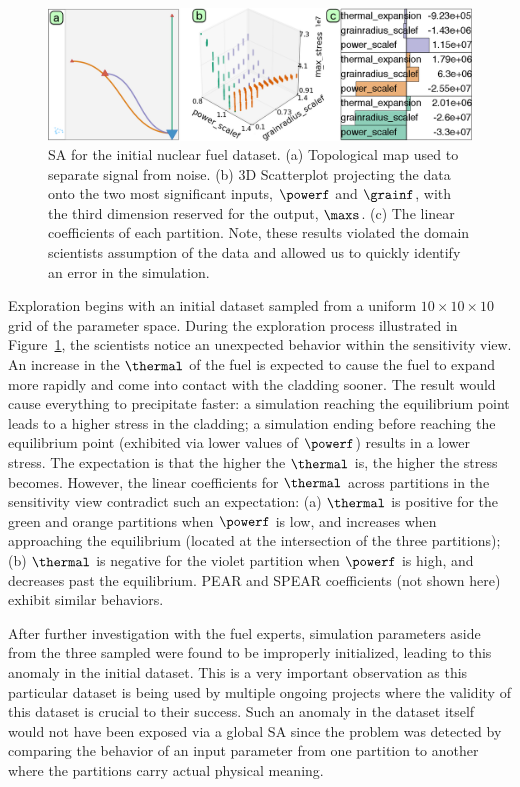 \begin{figure}[htbp]
  \centering
  \includegraphics[width=1.0\linewidth]{figs/chap6/bisonError2}
  \caption{SA for the initial nuclear fuel dataset.
  (a) Topological map used to separate signal from noise.
  (b) 3D Scatterplot projecting the data onto the two most significant inputs, $\powerf$ and $\grainf$, with the third dimension reserved for the output, $\maxs$.
  (c) The linear coefficients of each partition. Note, these results violated the domain scientists assumption of the data and allowed us to quickly identify an error in the simulation.}
  \label{fig:bisonError}
\end{figure}

Exploration begins with an initial dataset sampled from a
uniform $10\times10\times10$ grid of the parameter space.
%
During the exploration process illustrated in Figure~\ref{fig:bisonError}, the scientists notice an unexpected behavior within the sensitivity view.
%
An increase in the $\thermal$ of the fuel is expected to cause the fuel to expand more rapidly and come into contact with the cladding sooner.
%
The result would cause everything to precipitate faster: a simulation reaching the equilibrium point leads to a higher stress in the cladding; a simulation ending before reaching the equilibrium point (exhibited via lower values of $\powerf$) results in a lower stress.
%
The expectation is that the higher the $\thermal$ is, the higher the stress becomes.
%
However, the linear coefficients for $\thermal$ across partitions in the sensitivity view contradict such an expectation:
(a) $\thermal$ is positive for the green and orange partitions when $\powerf$ is low, and increases when approaching the equilibrium (located at the intersection of the three partitions);
(b) $\thermal$ is negative for the violet partition when $\powerf$ is high, and decreases past the equilibrium.
PEAR and SPEAR coefficients (not shown here) exhibit similar behaviors.

After further investigation with the fuel experts, simulation parameters aside from the three sampled were found to be improperly initialized, leading to this anomaly in the initial dataset.
%
This is a very important observation as this particular dataset is being used by multiple ongoing projects where the validity of this dataset is crucial to their success.
%
%
Such an anomaly in the dataset itself would not have been exposed via a global SA since the problem was detected by comparing the behavior of an input parameter from one partition to another where the partitions carry actual physical meaning.

